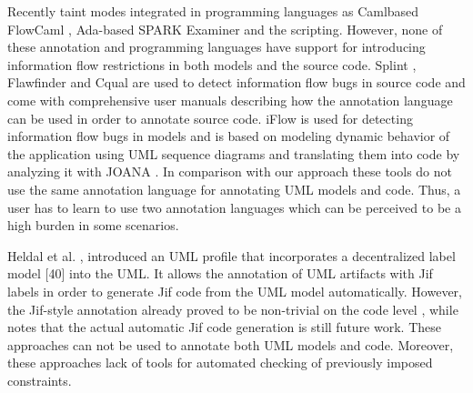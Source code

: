 Recently taint modes integrated in programming languages as Camlbased FlowCaml \cite{ref_32_simonet:report}, Ada-based SPARK Examiner \cite{ref_31_chapman:enforcing} and the scripting. However, none of these annotation and programming languages have support for introducing information flow
restrictions in both models and the source code.
Splint \cite{ref_30_david:splint}, Flawfinder \cite{ref_29_wheeler:flawfinder} and Cqual \cite{ref_28_umesh:cqual} are used to
detect information flow bugs in source code and come with
comprehensive user manuals describing how the annotation
language can be used in order to annotate source code.
iFlow \cite{ref_27_iflow:kuzman} is used for detecting information flow bugs in
models and is based on modeling dynamic behavior of the
application using UML sequence diagrams and translating
them into code by analyzing it with JOANA \cite{ref_26_kit:joana}. In comparison with our approach these tools do not use the same
annotation language for annotating UML models and code.
Thus, a user has to learn to use two annotation languages
which can be perceived to be a high burden in some scenarios.


 Heldal et al. \cite{ref_25_heldal:bridging}, \cite{ref_23_heldal:supporting} introduced an
UML profile that incorporates a decentralized label model [40]
into the UML. It allows the annotation of UML artifacts with
Jif \cite{ref_24_myers:descentrelized} labels in order to generate Jif code from the UML
model automatically. However, the Jif-style annotation already
proved to be non-trivial on the code level \cite{ref_22_preibusch2011information}, while \cite{ref_23_heldal:supporting}
notes that the actual automatic Jif code generation is still future
work. These approaches can not be used to annotate both UML
models and code. Moreover, these approaches lack of tools for
automated checking of previously imposed constraints.